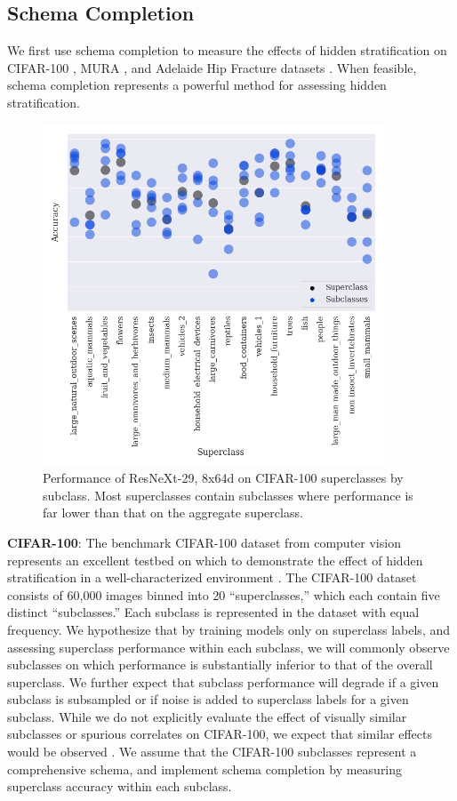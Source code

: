 \documentclass{article}
\begin{document}
\subsection{Schema Completion}

We first use schema completion to measure the effects of hidden stratification on CIFAR-100 \citep{Krizhevsky2009-tq}, MURA \citep{Rajpurkar2017-rc}, and Adelaide Hip Fracture datasets \citep{Gale_W_Oakden-Rayner_L_Carneiro_G_Bradley_AP_Palmer_LJ2017-tl}.
When feasible, schema completion represents a powerful method for assessing hidden stratification.

 \begin{figure}[htb!]
 \centering
\includegraphics[width=4in]{Superclass-Subclass-CIFAR-100-Correct-Val-v3.png}
\caption{Performance of ResNeXt-29, 8x64d on CIFAR-100 superclasses by subclass.  Most superclasses contain subclasses where performance is far lower than that on the aggregate superclass.}
\label{fig:cifar}
\end{figure}

\textbf{CIFAR-100}: The benchmark CIFAR-100 dataset from computer vision represents an excellent testbed on which to demonstrate the effect of hidden stratification in a well-characterized environment \citep{Krizhevsky2009-tq}.  
The CIFAR-100 dataset consists of 60,000 images binned into 20 ``superclasses,'' which each contain five distinct ``subclasses.'' 
 Each subclass is represented in the dataset with equal frequency.  
 We hypothesize that by training models only on superclass labels, and assessing superclass performance within each subclass, we will commonly observe subclasses on which performance is substantially inferior to that of the overall superclass.  
  We further expect that subclass performance will degrade if a given subclass is subsampled or if noise is added to superclass labels for a given subclass.  
 While we do not explicitly evaluate the effect of visually similar subclasses or spurious correlates on CIFAR-100, we expect that similar effects would be observed \citep{Selbst2017-gz}.  
 We assume that the CIFAR-100 subclasses represent a comprehensive schema, and implement schema completion by measuring superclass accuracy within each subclass.
 
\end{document}
